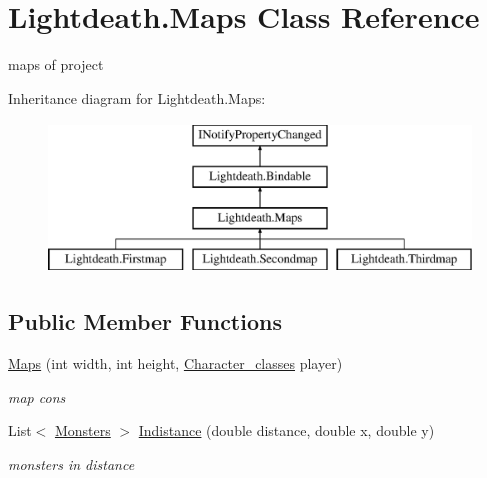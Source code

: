 \hypertarget{class_lightdeath_1_1_maps}{}\section{Lightdeath.\+Maps Class Reference}
\label{class_lightdeath_1_1_maps}


maps of project  


Inheritance diagram for Lightdeath.\+Maps\+:\begin{figure}[H]
\begin{center}
\leavevmode
\includegraphics[height=4.000000cm]{class_lightdeath_1_1_maps}
\end{center}
\end{figure}
\subsection*{Public Member Functions}
\begin{DoxyCompactItemize}
\item 
\hyperlink{class_lightdeath_1_1_maps_af78c0e7d26d9d5b0ea32475e36a6ccc0}{Maps} (int width, int height, \hyperlink{class_lightdeath_1_1_character__classes}{Character\+\_\+classes} player)
\begin{DoxyCompactList}\small\item\em map cons \end{DoxyCompactList}\item 
List$<$ \hyperlink{class_lightdeath_1_1_monsters}{Monsters} $>$ \hyperlink{class_lightdeath_1_1_maps_a4aa573714d0a34905d453a8065d07104}{Indistance} (double distance, double x, double y)
\begin{DoxyCompactList}\small\item\em monsters in distance \end{DoxyCompactList}\end{DoxyCompactItemize}
